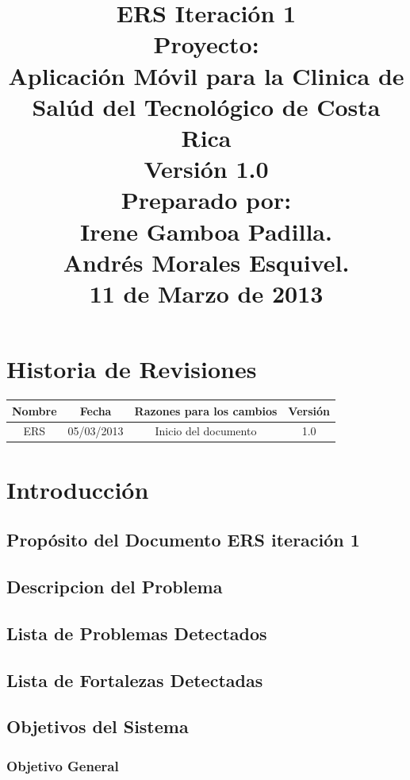 \documentclass[12pt]{article}
\title{\begin{flushright}\textbf{ERS Iteraci\'on 1} \\[0.7in] 
		Proyecto: \\[0.2in]
		\textbf{Aplicaci\'on M\'ovil para la Clinica de Sal\'ud del Tecnol\'ogico de Costa Rica}\\[0.7in]
		Versi\'on 1.0 \\[0.7in]
		Preparado por: \\[0.2in]
		\textbf{Irene Gamboa Padilla.\\
		Andr\'es Morales Esquivel.} \\[0.7in]
		11 de Marzo de 2013
		\end{flushright}}
\author{}
\date{}
\begin{document}
\maketitle
\newpage
\renewcommand{\contentsname}{Tabla de Contenido}
{\footnotesize
	\tableofcontents
}
\section{Historia de Revisiones}

\begin{center}
	\begin{tabular}{|c|c|c|c|}
	\hline
		\textbf{Nombre} & \textbf{Fecha} & \textbf{Razones para los cambios} & \textbf{Versi\'on}\\
	\hline
		ERS & 05/03/2013 & Inicio del documento & 1.0\\
	\hline
	\end{tabular}
\end{center}

\newpage

\section{Introducci\'on}

\subsection{Prop\'osito del Documento ERS iteraci\'on 1}

\subsection{Descripcion del Problema}

\subsection{Lista de Problemas Detectados}

\subsection{Lista de Fortalezas Detectadas}

\subsection{Objetivos del Sistema}

\subsubsection{Objetivo General}
\end{document}
